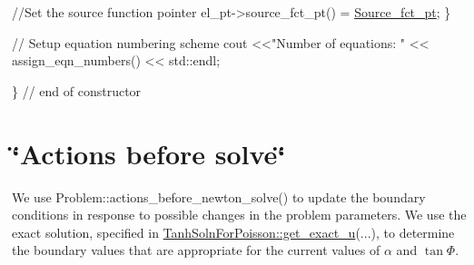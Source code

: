 \begin{DoxyCodeInclude}
   \textcolor{comment}{//Set the source function pointer}
   el\_pt->source\_fct\_pt() = \hyperlink{classPoissonProblem_a2ba5bb705abab012b72bbd7f4016d5fe}{Source\_fct\_pt};
  \}


 \textcolor{comment}{// Setup equation numbering scheme}
 cout <<\textcolor{stringliteral}{"Number of equations: "} << assign\_eqn\_numbers() << std::endl; 

\} \textcolor{comment}{// end of constructor}

\end{DoxyCodeInclude}




 

\hypertarget{index_actions_before}{}\section{\char`\"{}\+Actions before solve\char`\"{}}\label{index_actions_before}
We use {\ttfamily Problem\+::actions\+\_\+before\+\_\+newton\+\_\+solve()} to update the boundary conditions in response to possible changes in the problem parameters. We use the exact solution, specified in {\ttfamily \hyperlink{namespaceTanhSolnForPoisson_af7896e9c18ce6438c73ae2a875e8b7de}{Tanh\+Soln\+For\+Poisson\+::get\+\_\+exact\+\_\+u}}(...), to determine the boundary values that are appropriate for the current values of $ \alpha $ and $ \tan \Phi $.


